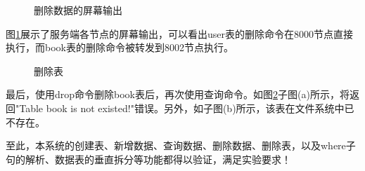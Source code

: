 \begin{figure}[H]
    \centering
    \caption{删除数据的屏幕输出}
    \label{fig:delete-log}
\end{figure}

图\ref{fig:delete-log}展示了服务端各节点的屏幕输出，可以看出user表的删除命令在8000节点直接执行，而book表的删除命令被转发到8002节点执行。

\begin{figure}[H]
    \centering
    \caption{删除表}
    \label{fig:drop}
\end{figure}

最后，使用drop命令删除book表后，再次使用查询命令。如图\ref{fig:drop}子图(a)所示，将返回"Table book is not existed!"错误。另外，如子图(b)所示，该表在文件系统中已不存在。

至此，本系统的创建表、新增数据、查询数据、删除数据、删除表，以及where子句的解析、数据表的垂直拆分等功能都得以验证，满足实验要求！